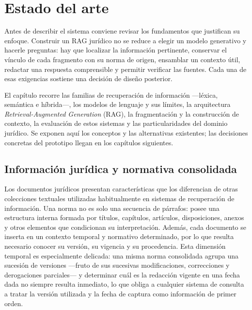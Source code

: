 
\chapter{Estado del arte}
\label{chap:estado-arte}

Antes de describir el sistema conviene revisar los fundamentos que justifican su enfoque. Construir un RAG jurídico no se reduce a elegir un modelo generativo y hacerle preguntas: hay que localizar la información pertinente, conservar el vínculo de cada fragmento con su norma de origen, ensamblar un contexto útil, redactar una respuesta comprensible y permitir verificar las fuentes. Cada una de esas exigencias sostiene una decisión de diseño posterior.

El capítulo recorre las familias de recuperación de información —léxica, semántica e híbrida—, los modelos de lenguaje y sus límites, la arquitectura \emph{Retrieval-Augmented Generation} (RAG), la fragmentación y la construcción de contexto, la evaluación de estos sistemas y las particularidades del dominio jurídico. Se exponen aquí los conceptos y las alternativas existentes; las decisiones concretas del prototipo llegan en los capítulos siguientes.

\section{Información jurídica y normativa consolidada}
\label{sec:informacion-juridica}

Los documentos jurídicos presentan características que los diferencian de otras colecciones textuales utilizadas habitualmente en sistemas de recuperación de información. Una norma no es solo una secuencia de párrafos: posee una estructura interna formada por títulos, capítulos, artículos, disposiciones, anexos y otros elementos que condicionan su interpretación. Además, cada documento se inserta en un contexto temporal y normativo determinado, por lo que resulta necesario conocer su versión, su vigencia y su procedencia. Esta dimensión temporal es especialmente delicada: una misma norma consolidada agrupa una sucesión de versiones —fruto de sus sucesivas modificaciones, correcciones y derogaciones parciales— y determinar cuál es la redacción vigente en una fecha dada no siempre resulta inmediato, lo que obliga a cualquier sistema de consulta a tratar la versión utilizada y la fecha de captura como información de primer orden.

